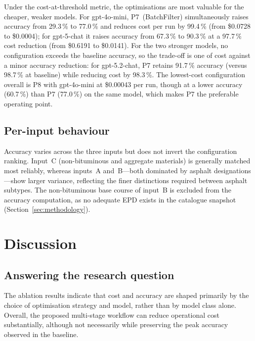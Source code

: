 \documentclass[10pt, a4paper, twocolumn]{article}
\begin{document}
Under the cost-at-threshold metric, the optimisations are most valuable for the cheaper,
weaker models. For gpt-4o-mini, P7~(BatchFilter) simultaneously raises accuracy from
29.3\,\% to 77.0\,\% and reduces cost per run by 99.4\,\% (from \$0.0728 to \$0.0004);
for gpt-5-chat it raises accuracy from 67.3\,\% to 90.3\,\% at a 97.7\,\% cost reduction
(from \$0.6191 to \$0.0141). For the two stronger models, no configuration exceeds the
baseline accuracy, so the trade-off is one of cost against a minor accuracy reduction:
for gpt-5.2-chat, P7 retains 91.7\,\% accuracy (versus 98.7\,\% at baseline) while
reducing cost by 98.3\,\%. The lowest-cost configuration overall is P8 with gpt-4o-mini
at \$0.00043 per run, though at a lower accuracy (60.7\,\%) than P7 (77.0\,\%) on the
same model, which makes P7 the preferable operating point.

\subsection{Per-input behaviour}

Accuracy varies across the three inputs but does not invert the configuration ranking.
Input~C (non-bituminous and aggregate materials) is generally matched most reliably,
whereas inputs~A and~B---both dominated by asphalt designations---show larger
variance, reflecting the finer distinctions required between asphalt subtypes. The
non-bituminous base course of input~B is excluded from the accuracy computation, as no
adequate EPD exists in the catalogue snapshot (Section~\ref{sec:methodology}). %



\section{Discussion}

\subsection{Answering the research question}

The ablation results indicate that cost and accuracy are shaped primarily by the
choice of optimisation strategy and model, rather than by model class alone.
Overall, the proposed multi-stage workflow can reduce operational cost
substantially, although not necessarily while preserving the peak accuracy
observed in the baseline.
\end{document}
